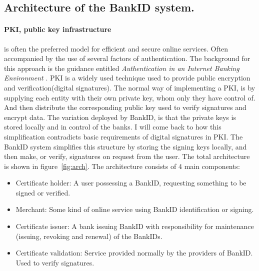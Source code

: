 \documentclass[a4paper,11pt]{article}
\begin{document}
\subsection{Architecture of the BankID system.}
\paragraph{PKI, public key infrastructure} is often the preferred model for efficient and secure online services. Often accompanied by the use of several factors of authentication. The background for this approach is the guidance entitled \emph{Authentication in an Internet Banking Environment} \cite{auth-banking}. PKI is a widely used technique used to provide public encryption and verification(digital signatures). The normal way of implementing a PKI, is by supplying each entity with their own private key, whom only they have control of. And then distribute the corresponding public key used to verify signatures and encrypt data. The variation deployed by BankID, is that the private keys is stored locally and in control of the banks. I will come back to how this simplification contradicts basic requirements of digital signatures in PKI. The BankID system simplifies this structure by storing the signing keys locally, and then make, or verify, signatures on request from the user. The total architecture is shown in {figure~\ref*{fig:arch}}. The architecture consists of 4 main components\cite{whitepaper}:
\begin{itemize}
  \item Certificate holder: A user possessing a BankID, requesting something to be signed or verified.
  \item Merchant: Some kind of online service using BankID identification or signing.
  \item Certificate issuer: A bank issuing BankID with responsibility for maintenance (issuing, revoking and renewal) of the BankIDs.
  \item Certificate validation: Service provided normally by the providers of BankID. Used to verify signatures. 
\end{itemize}
\end{document}
